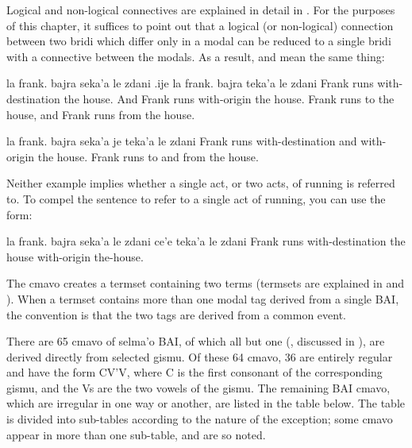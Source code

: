 Logical and non-logical connectives are explained in detail
    in . For the purposes of
    this chapter, it suffices to point out that a logical (or
    non-logical) connection between two bridi which differ only in
    a modal can be reduced to a single bridi with a connective
    between the modals. As a result,  and  mean the same
    thing:
\begin{example}
la frank. bajra seka'a le zdani\n
\T	.ije la frank. bajra teka'a le zdani\n
Frank runs with-destination the house.\n
\T	And Frank runs with-origin the house.\n
Frank runs to the house, and Frank runs from the house.
\end{example}

\begin{example}
la frank. bajra seka'a je teka'a le zdani\n
Frank runs with-destination and with-origin the house.\n
Frank runs to and from the house.
\end{example}

Neither example implies whether a single act, or two acts, of
    running is referred to. To compel the sentence to refer to a
    single act of running, you can use the form:
\begin{example}
la frank. bajra seka'a le zdani\n
\T	ce'e teka'a le zdani\n
Frank runs with-destination the house\n
\T	{} with-origin the-house.
\end{example}

The cmavo  creates a termset containing two terms
    (termsets are explained in 
    and ). When a termset
    contains more than one modal tag derived from a single BAI, the
    convention is that the two tags are derived from a common
    event.



There are 65 cmavo of selma'o BAI, of which all but one
    (, discussed in ), are
    derived directly from selected gismu. Of these 64 cmavo, 36 are
    entirely regular and have the form CV'V, where C is the first
    consonant of the corresponding gismu, and the Vs are the two
    vowels of the gismu. The remaining BAI cmavo, which are
    irregular in one way or another, are listed in the table below.
    The table is divided into sub-tables according to the nature of
    the exception; some cmavo appear in more than one sub-table,
    and are so noted.

